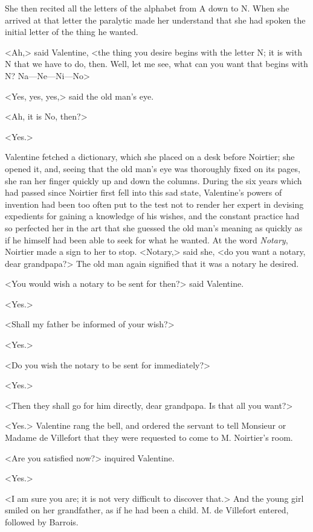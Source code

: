  She then recited all the letters of the alphabet from A down to N. When she arrived at that letter the paralytic made her understand that she had spoken the initial letter of the thing he wanted. 

 <Ah,> said Valentine, <the thing you desire begins with the letter N; it is with N that we have to do, then. Well, let me see, what can you want that begins with N? Na—Ne—Ni—No\longdash> 

 <Yes, yes, yes,> said the old man's eye. 

 <Ah, it is No, then?> 

 <Yes.> 

 Valentine fetched a dictionary, which she placed on a desk before Noirtier; she opened it, and, seeing that the old man's eye was thoroughly fixed on its pages, she ran her finger quickly up and down the columns. During the six years which had passed since Noirtier first fell into this sad state, Valentine's powers of invention had been too often put to the test not to render her expert in devising expedients for gaining a knowledge of his wishes, and the constant practice had so perfected her in the art that she guessed the old man's meaning as quickly as if he himself had been able to seek for what he wanted. At the word \textit{Notary}, Noirtier made a sign to her to stop.  <Notary,> said she, <do you want a notary, dear grandpapa?> The old man again signified that it was a notary he desired. 

 <You would wish a notary to be sent for then?> said Valentine. 

 <Yes.> 

 <Shall my father be informed of your wish?> 

 <Yes.> 

 <Do you wish the notary to be sent for immediately?> 

 <Yes.> 

 <Then they shall go for him directly, dear grandpapa. Is that all you want?> 

 <Yes.> Valentine rang the bell, and ordered the servant to tell Monsieur or Madame de Villefort that they were requested to come to M. Noirtier's room. 

 <Are you satisfied now?> inquired Valentine. 

 <Yes.> 

 <I am sure you are; it is not very difficult to discover that.> And the young girl smiled on her grandfather, as if he had been a child. M. de Villefort entered, followed by Barrois. 

